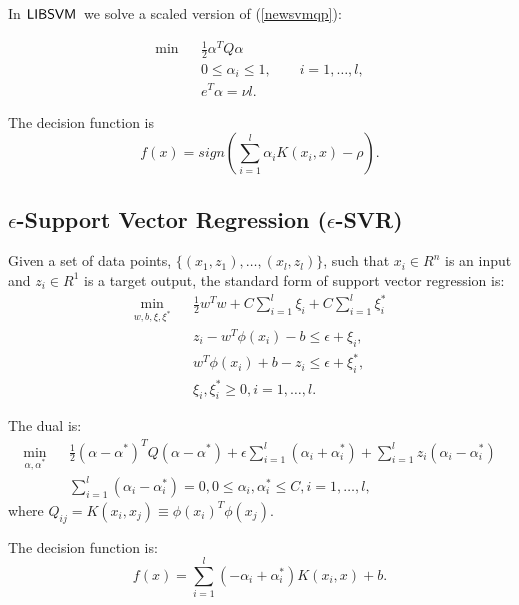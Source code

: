 \documentclass[11pt]{article}
\newcommand{\libsvm}{$\mbox{{\sf LIBSVM}}$}
\theoremstyle{break}
\begin{document}
In \libsvm\ we solve a scaled 
version of (\ref{newsvmqp}):

\begin{eqnarray}
\min && \frac{1}{2}\alpha^T
Q\alpha  \nonumber  \\
 && 0 \leq \alpha_i \leq 1, \qquad i = 1, \ldots, l,    \nonumber \\
&& e^T \alpha = \nu l.  \nonumber
\end{eqnarray}

The decision function is
\begin{equation*}
f(x) = 
sign(\sum_{i=1}^l 
\alpha_i K(x_i, x) - \rho).  
\end{equation*}

\subsection{$\epsilon$-Support Vector Regression
($\epsilon$-SVR)}
Given a set of data points,
$\{(x_1, z_1), \ldots, 
(x_l, z_l)\}$, such that
$x_i \in R^n$ is
an input and $z_i \in R^1$
is a target output, 
the standard form of support vector 
regression 
is:
\begin{eqnarray*}
 \min_{w,b,\xi,\xi^*} &&\frac{1}{2} 
w^Tw 
+ C \sum_{i=1}^l
\xi_i
+ C \sum_{i=1}^l
\xi_i^* 
 \\
&& z_i - w^T \phi(x_i) - b \leq 
\epsilon + \xi_i ,  \\
&& w^T \phi(x_i) + b -z_i\leq 
\epsilon + \xi_i^* ,  \\
&& \xi_i, \xi_i^* \geq 0, 
i = 1, \ldots, l. 
\end{eqnarray*}

The dual is:
\begin{eqnarray}
 \min_{\alpha, \alpha^*} && \frac{1}{2}
(\alpha - \alpha^*)^T
Q(\alpha - \alpha^*) 
+\epsilon 
\sum_{i=1}^l (\alpha_i
+ \alpha_i^*)
+ \sum_{i=1}^l 
z_i (\alpha_i - \alpha^*_i) 
\nonumber  \\
&& 
\sum_{i=1}^l (\alpha_i 
- \alpha_i^*) = 0,0 \leq \alpha_i,
\alpha_i^* \leq C, i = 1, \ldots,l,    \label{svr}
\end{eqnarray}
where $Q_{ij} =
K(x_i,x_j) \equiv \phi(x_i)^T
\phi(x_j)$.

The decision function is:
\begin{equation*}
f(x) 
= \sum_{i=1}^l 
(-\alpha_i + \alpha_i^*) K(x_i,x)
+ b.
\end{equation*}
\end{document}
